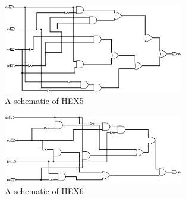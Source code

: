 \documentclass{article}
\begin{document}
\begin{enumerate}
\begin{figure}[ht!]
    \centering
    \includegraphics[width=0.7\textwidth]{part2_hex5.png}
    \caption{A schematic of HEX5}
    \label{f:part2_hex5}
\end{figure}

\begin{figure}[ht!]
    \centering
    \includegraphics[width=0.7\textwidth]{part2_hex6.png}
    \caption{A schematic of HEX6}
    \label{f:part2_hex6}
\end{figure}

\end{enumerate}
\end{document}
